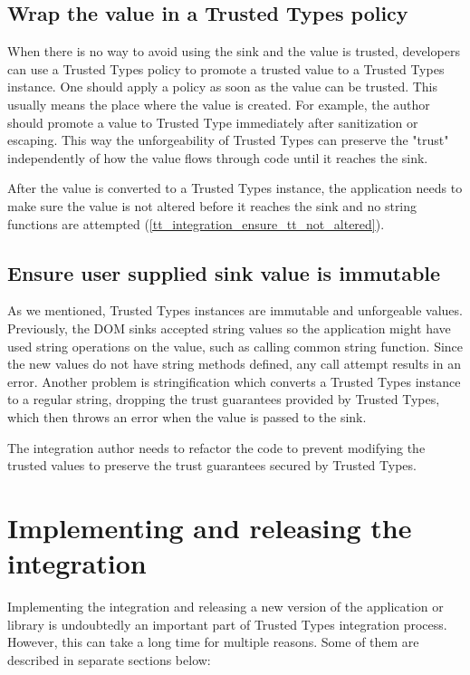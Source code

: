 \subsection{Wrap the value in a Trusted Types policy}

When there is no way to avoid using the sink and the value is trusted, developers can use a Trusted
Types policy to promote a trusted value to a Trusted Types instance. One should apply a policy as
soon as the value can be trusted. This usually means the place where the value is created. For
example, the author should promote a value to Trusted Type immediately after sanitization or
escaping. This way the unforgeability of Trusted Types can preserve the "trust" independently of how
the value flows through code until it reaches the sink.

After the value is converted to a Trusted Types instance, the application needs to make sure the
value is not altered before it reaches the sink and no string functions are attempted
(\ref{tt_integration_ensure_tt_not_altered}).

\label{tt_integration_ensure_tt_not_altered}
\subsection{Ensure user supplied sink value is immutable}

As we mentioned, Trusted Types instances are immutable and unforgeable values. Previously, the DOM
sinks accepted string values so the application might have used string operations on the value, such
as calling common string function. Since the new values do not have string methods defined, any call
attempt results in an error. Another problem is stringification which converts a Trusted Types
instance to a regular string, dropping the trust guarantees provided by Trusted Types, which then
throws an error when the value is passed to the sink.

The integration author needs to refactor the code to prevent modifying the trusted values to
preserve the trust guarantees secured by Trusted Types.

\section{Implementing and releasing the integration}

Implementing the integration and releasing a new version of the application or library is
undoubtedly an important part of Trusted Types integration process. However, this can take a long
time for multiple reasons. Some of them are described in separate sections below:

